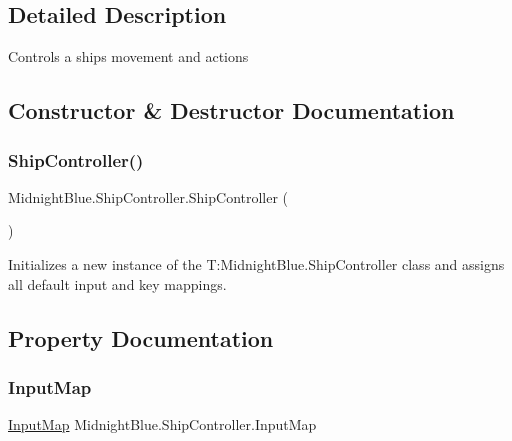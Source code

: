 \subsection{Detailed Description}
Controls a ships movement and actions 



\subsection{Constructor \& Destructor Documentation}
\hypertarget{class_midnight_blue_1_1_ship_controller_a07d38d2b98b9b132f1eff9cc8879f278}{}\label{class_midnight_blue_1_1_ship_controller_a07d38d2b98b9b132f1eff9cc8879f278} 
\subsubsection{\texorpdfstring{Ship\+Controller()}{ShipController()}}
{\footnotesize\ttfamily Midnight\+Blue.\+Ship\+Controller.\+Ship\+Controller (\begin{DoxyParamCaption}{ }\end{DoxyParamCaption})\hspace{0.3cm}{\ttfamily [inline]}}



Initializes a new instance of the T\+:\+Midnight\+Blue.\+Ship\+Controller class and assigns all default input and key mappings. 



\subsection{Property Documentation}
\hypertarget{class_midnight_blue_1_1_ship_controller_a50136c59b5a0e80d280aec4b6de46414}{}\label{class_midnight_blue_1_1_ship_controller_a50136c59b5a0e80d280aec4b6de46414} 
\subsubsection{\texorpdfstring{Input\+Map}{InputMap}}
{\footnotesize\ttfamily \hyperlink{class_m_b2_d_1_1_i_o_1_1_input_map}{Input\+Map} Midnight\+Blue.\+Ship\+Controller.\+Input\+Map\hspace{0.3cm}{\ttfamily [get]}}



